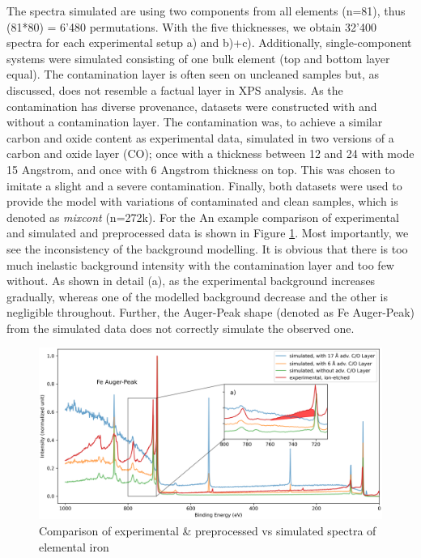 The spectra simulated are using two components from all elements (n=81), thus (81*80) = 6'480 permutations. With the five thicknesses, we obtain 32'400 spectra for each experimental setup a) and b)+c). Additionally, single-component systems were simulated consisting of one bulk element (top and bottom layer equal). The contamination layer is often seen on uncleaned samples but, as discussed, does not resemble a factual layer in XPS analysis. As the contamination has diverse provenance, datasets were constructed with and without a contamination layer. The contamination was, to achieve a similar carbon and oxide content as experimental data, simulated in two versions of a carbon and oxide layer (CO); once with a thickness between 12 and 24 with mode 15 Angstrom, and once with 6 Angstrom thickness on top. This was chosen to imitate a slight and a severe contamination. Finally, both datasets were used to provide the model with variations of contaminated and clean samples, which is denoted as \emph{mixcont} (n=272k). For the 
An example comparison of experimental and simulated and preprocessed data is shown in Figure \ref{fig:ex_vs_sim}. Most importantly, we see the inconsistency of the background modelling. It is obvious that there is too much inelastic background intensity with the contamination layer and too few without. As shown in detail (a), as the experimental background increases gradually, whereas one of the modelled background decrease and the other is negligible throughout. Further, the Auger-Peak shape (denoted as Fe Auger-Peak) from the simulated data does not correctly simulate the observed one.


\begin{figure}[H]
    \includegraphics[width=\textwidth]{Figures/Fe_XPS.png}
    \caption{Comparison of experimental \& preprocessed vs simulated spectra of elemental iron}
    \label{fig:ex_vs_sim}
    \centering
\end{figure}

